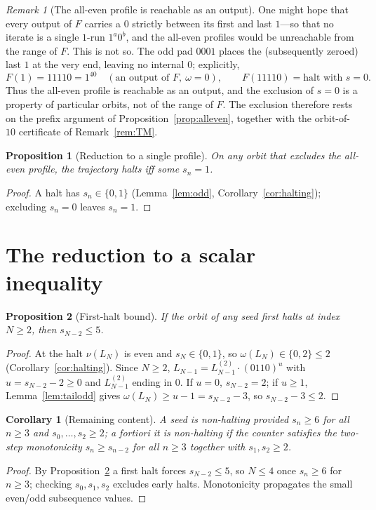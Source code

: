 \documentclass[11pt,reqno]{amsart}
\theoremstyle{plain}
\newtheorem{proposition}{Proposition}
\newtheorem{corollary}{Corollary}
\theoremstyle{definition}
\theoremstyle{remark}
\newtheorem{remark}{Remark}
\begin{document}
\begin{remark}[The all-even profile is reachable as an output]\label{rem:rem18}
One might hope that every output of $F$ carries a $0$ strictly between its first and last $1$---so that no iterate is a single $1$-run $1^a0^b$, and the all-even profiles would be unreachable from the range of $F$. This is not so. The odd pad $0001$ places the (subsequently zeroed) last $1$ at the very end, leaving no internal $0$; explicitly,
\[ F(1)=11110=1^40\quad(\text{an output of }F,\ \omega=0),\qquad F(11110)=\text{halt with }s=0. \]
Thus the all-even profile is reachable as an output, and the exclusion of $s=0$ is a property of particular orbits, not of the range of $F$. The exclusion therefore rests on the prefix argument of Proposition~\ref{prop:alleven}, together with the orbit-of-$10$ certificate of Remark~\ref{rem:TM}.
\end{remark}

\begin{proposition}[Reduction to a single profile]\label{prop:single}
On any orbit that excludes the all-even profile, the trajectory halts iff some $s_n=1$.
\end{proposition}
\begin{proof}
A halt has $s_n\in\{0,1\}$ (Lemma~\ref{lem:odd}, Corollary~\ref{cor:halting}); excluding $s_n=0$ leaves $s_n=1$.
\end{proof}

\section{The reduction to a scalar inequality}\label{sec:reduction}
\begin{proposition}[First-halt bound]\label{prop:firsthalt}
If the orbit of any seed first halts at index $N\ge 2$, then $s_{N-2}\le 5$.
\end{proposition}
\begin{proof}
At the halt $\nu(L_N)$ is even and $s_N\in\{0,1\}$, so $\omega(L_N)\in\{0,2\}\le 2$ (Corollary~\ref{cor:halting}). Since $N\ge 2$, $L_{N-1}=L^{(2)}_{N-1}\cdot(0110)^u$ with $u=s_{N-2}-2\ge 0$ and $L^{(2)}_{N-1}$ ending in $0$. If $u=0$, $s_{N-2}=2$; if $u\ge 1$, Lemma~\ref{lem:tailodd} gives $\omega(L_N)\ge u-1=s_{N-2}-3$, so $s_{N-2}-3\le 2$.
\end{proof}

\begin{corollary}[Remaining content]\label{cor:remaining}
A seed is non-halting provided $s_n\ge 6$ for all $n\ge 3$ and $s_0,\dots,s_2\ge 2$; a fortiori it is non-halting if the counter satisfies the two-step monotonicity $s_n\ge s_{n-2}$ for all $n\ge 3$ together with $s_1,s_2\ge 2$.
\end{corollary}
\begin{proof}
By Proposition~\ref{prop:firsthalt} a first halt forces $s_{N-2}\le 5$, so $N\le 4$ once $s_n\ge 6$ for $n\ge 3$; checking $s_0,s_1,s_2$ excludes early halts. Monotonicity propagates the small even/odd subsequence values.
\end{proof}
\end{document}
